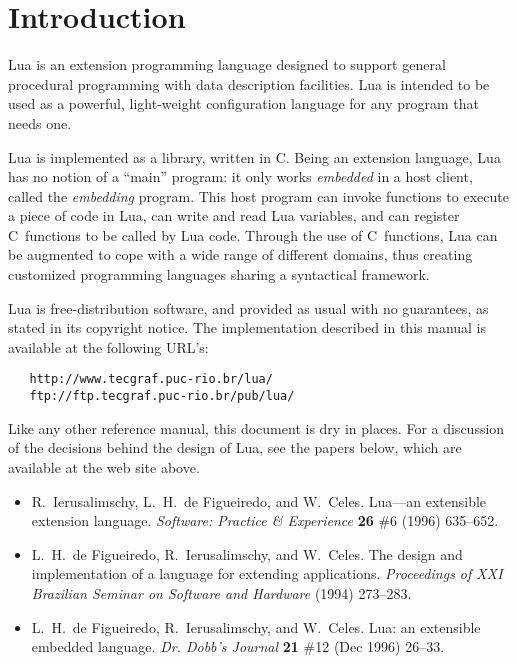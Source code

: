 \documentclass[11pt]{article}
\begin{document}
\newpage
\null
\newpage
\tableofcontents

\newpage
\setcounter{page}{1}
\pagestyle{plain}


\section{Introduction}

Lua is an extension programming language designed to support
general procedural programming with data description
facilities.
Lua is intended to be used as a powerful, light-weight
configuration language for any program that needs one.

Lua is implemented as a library, written in C.
Being an extension language, Lua has no notion of a ``main'' program:
it only works \emph{embedded} in a host client,
called the \emph{embedding} program.
This host program can invoke functions to execute a piece of
code in Lua, can write and read Lua variables,
and can register C~functions to be called by Lua code.
Through the use of C~functions, Lua can be augmented to cope with
a wide range of different domains,
thus creating customized programming languages sharing a syntactical framework.

Lua is free-distribution software,
and provided as usual with no guarantees,
as stated in its copyright notice.
The implementation described in this manual is available
at the following URL's:
\begin{verbatim}
   http://www.tecgraf.puc-rio.br/lua/
   ftp://ftp.tecgraf.puc-rio.br/pub/lua/
\end{verbatim}

Like any other reference manual,
this document is dry in places.
For a discussion of the decisions behind the design of Lua,
see the papers below,
which are available at the web site above.
\begin{itemize}
\item
R.~Ierusalimschy, L.~H.~de Figueiredo, and W.~Celes.
Lua---an extensible extension language.
\emph{Software: Practice \& Experience} {\bf 26} \#6 (1996) 635--652.
\item
L.~H.~de Figueiredo, R.~Ierusalimschy, and W.~Celes.
The design and implementation of a language for extending applications.
\emph{Proceedings of XXI Brazilian Seminar on Software and Hardware} (1994) 273--283.
\item
L.~H.~de Figueiredo, R.~Ierusalimschy, and W.~Celes.
Lua: an extensible embedded language.
\emph{Dr. Dobb's Journal} {\bf  21} \#12 (Dec 1996) 26--33.
\end{itemize}
\end{document}
